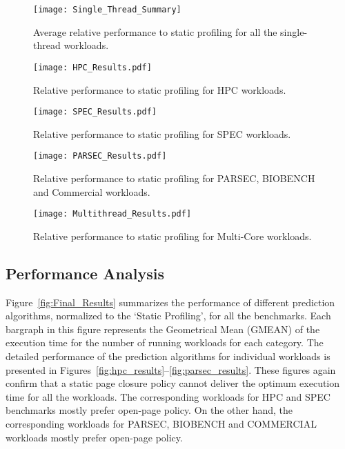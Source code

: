 \begin{figure*}
\centering
\texttt{[image: Single\_Thread\_Summary]}
\caption{Average relative performance to static profiling for all the single-thread workloads.}
\label{fig:Final_Results}

\vspace{5 mm}

\centering
\texttt{[image: HPC\_Results.pdf]}
\caption{Relative performance to static profiling for HPC workloads.}
\label{fig:hpc_results}

\vspace{5 mm}

\centering
\texttt{[image: SPEC\_Results.pdf]}
\caption{Relative performance to static profiling for SPEC workloads.}
\label{fig:spec_results}

\vspace{5 mm}

\centering
\texttt{[image: PARSEC\_Results.pdf]}
\caption{Relative performance to static profiling for PARSEC, BIOBENCH and Commercial workloads.}
\label{fig:parsec_results}

\vspace{5 mm}

\centering
\texttt{[image: Multithread\_Results.pdf]}
\caption{Relative performance to static profiling for Multi-Core workloads.}
\label{fig:multithread_thread_results}
\end{figure*}








\subsection{Performance Analysis}
Figure~\ref{fig:Final_Results} summarizes the performance of different prediction algorithms, normalized to the `Static Profiling', for all the benchmarks. Each bargraph in this figure represents the Geometrical Mean (GMEAN) of the execution time for the number of running workloads for each category. The detailed performance of the prediction algorithms for individual workloads is presented in Figures~\ref{fig:hpc_results}--\ref{fig:parsec_results}. These figures  again confirm that a static page closure policy cannot deliver the optimum execution time for all the workloads. The corresponding workloads for HPC and SPEC benchmarks mostly prefer open-page policy. On the other hand, the corresponding workloads for PARSEC, BIOBENCH and COMMERCIAL workloads mostly prefer open-page policy.







